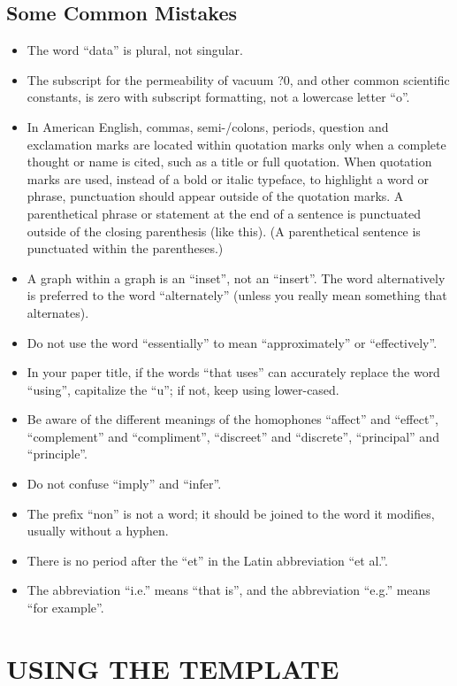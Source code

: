 \documentclass[letterpaper, 10 pt, conference]{ieeeconf}  %
\begin{document}
\subsection{Some Common Mistakes}
\begin{itemize}


\item The word “data” is plural, not singular.
\item The subscript for the permeability of vacuum ?0, and other common scientific constants, is zero with subscript formatting, not a lowercase letter “o”.
\item In American English, commas, semi-/colons, periods, question and exclamation marks are located within quotation marks only when a complete thought or name is cited, such as a title or full quotation. When quotation marks are used, instead of a bold or italic typeface, to highlight a word or phrase, punctuation should appear outside of the quotation marks. A parenthetical phrase or statement at the end of a sentence is punctuated outside of the closing parenthesis (like this). (A parenthetical sentence is punctuated within the parentheses.)
\item A graph within a graph is an “inset”, not an “insert”. The word alternatively is preferred to the word “alternately” (unless you really mean something that alternates).
\item Do not use the word “essentially” to mean “approximately” or “effectively”.
\item In your paper title, if the words “that uses” can accurately replace the word “using”, capitalize the “u”; if not, keep using lower-cased.
\item Be aware of the different meanings of the homophones “affect” and “effect”, “complement” and “compliment”, “discreet” and “discrete”, “principal” and “principle”.
\item Do not confuse “imply” and “infer”.
\item The prefix “non” is not a word; it should be joined to the word it modifies, usually without a hyphen.
\item There is no period after the “et” in the Latin abbreviation “et al.”.
\item The abbreviation “i.e.” means “that is”, and the abbreviation “e.g.” means “for example”.

\end{itemize}


\section{USING THE TEMPLATE}
\end{document}

